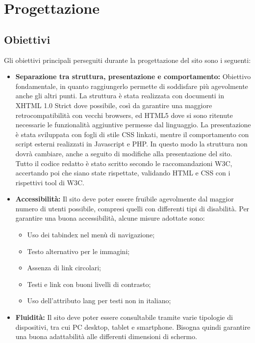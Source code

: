 \documentclass{article}
\begin{document}
	\section{Progettazione}
		\subsection{Obiettivi}
		    Gli obiettivi principali perseguiti durante la progettazione del sito sono i seguenti:
		    \begin{itemize}
		        \item \textbf{Separazione tra struttura, presentazione e comportamento:}
		        Obiettivo fondamentale, in quanto raggiungerlo permette di soddisfare più agevolmente anche gli altri punti. 
		        La struttura è stata realizzata con documenti in XHTML 1.0 Strict dove possibile, così da garantire una maggiore retrocompatibilità con vecchi browsers, ed HTML5 dove si sono ritenute necessarie le funzionalità aggiuntive permesse dal linguaggio. 
		        La presentazione è stata sviluppata con fogli di stile CSS linkati, mentre il comportamento con script esterni realizzati in Javascript e PHP. In questo modo la struttura non dovrà cambiare, anche a seguito di modifiche alla presentazione del sito.
		        Tutto il codice redatto è stato scritto secondo le raccomandazioni W3C, accertando poi che siano state rispettate, validando HTML e CSS con i rispettivi tool di W3C.
		        \item \textbf{Accessibilità:}
		        Il sito deve poter essere fruibile agevolmente dal maggior numero di utenti possibile, compresi quelli con differenti tipi di disabilità. Per garantire una buona accessibilità, alcune misure adottate sono:
		        \begin{itemize}
		            \item Uso dei tabindex nel menù di navigazione;
		            \item Testo alternativo per le immagini;
		            \item Assenza di link circolari;
		            \item Testi e link con buoni livelli di contrasto;
		            \item Uso dell'attributo lang per testi non in italiano;
		        \end{itemize}
		        \item \textbf{Fluidità:}
		        Il sito deve poter essere consultabile tramite varie tipologie di dispositivi, tra cui PC desktop, tablet e smartphone. Bisogna quindi garantire una buona adattabilità alle differenti dimensioni di schermo.

\end{itemize}
\end{document}

